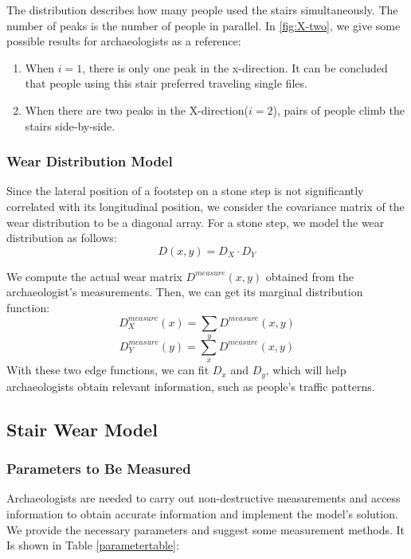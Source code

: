 \documentclass[12pt]{article}  %
\numberwithin{equation}{section} %
\begin{document}
The distribution describes how many people used the stairs simultaneously. The number of peaks is the number of people in parallel. In \autoref{fig:X-two}, we give some possible results for archaeologists as a reference: 
\begin{enumerate}[\bfseries 1.]
	\setlength{\parsep}{0ex} %
	\setlength{\topsep}{-1ex} %
	\setlength{\itemsep}{0ex} %
	\item When $i=1$, there is only one peak in the x-direction. It can be concluded that people using this stair preferred traveling single files. 
	\item When there are two peaks in the X-direction($i=2$), pairs of people climb the stairs side-by-side.  
\end{enumerate}
\subsubsection{Wear Distribution Model}
Since the lateral position of a footstep on a stone step is not significantly correlated with its longitudinal position, we consider the covariance matrix of the wear distribution to be a diagonal array. For a stone step, we model the wear distribution as follows:
\begin{equation}
    D(x,y)=D_X\cdot{D_Y}
\end{equation}

We compute the actual wear matrix $D^{measure}(x,y)$ obtained from the archaeologist's measurements. Then, we can get its marginal distribution function:
\begin{equation}
    D_X^{measure}(x)=\sum_y{D^{measure}(x,y)}
\end{equation}
\vspace{-1.0em}
\begin{equation}
    D_Y^{measure}(y)=\sum_x{D^{measure}(x,y)}
\end{equation}
With these two edge functions, we can fit $D_x$ and $D_y$, which will help archaeologists obtain relevant information, such as people's traffic patterns.
\vspace{-1.0em}
\subsection{Stair Wear Model}
\subsubsection{Parameters to Be Measured}
 \vspace{-1.0em}
Archaeologists are needed to carry out non-destructive measurements and access information to obtain accurate information and implement the model's solution. We provide the necessary parameters and suggest some measurement methods. It Is shown in Table \ref{parametertable}:
\end{document}
